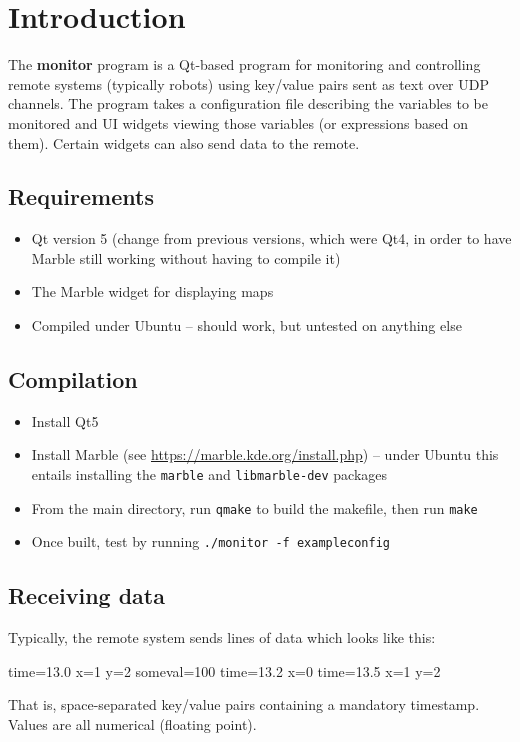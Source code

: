 \section{Introduction}
The \textbf{monitor} program is a Qt-based program for monitoring
and controlling remote systems (typically robots) using key/value pairs
sent as text over UDP channels. The program takes a configuration
file describing the variables to be monitored and UI widgets viewing
those variables (or expressions based on them). Certain widgets 
can also send data to the remote.

\subsection{Requirements}
\begin{itemize}
\item Qt version 5 (change from previous versions, which were Qt4, in
order to have Marble still working without having to compile it)
\item The Marble widget for displaying maps
\item Compiled under Ubuntu -- should work, but untested on anything else
\end{itemize}

\subsection{Compilation}
\begin{itemize}
\item Install Qt5
\item Install Marble (see \url{https://marble.kde.org/install.php}) --
under Ubuntu this entails installing the \texttt{marble} and \texttt{libmarble-dev}
packages
\item From the main directory, run \texttt{qmake} to build the makefile, then run \texttt{make}
\item Once built, test by running \texttt{./monitor -f exampleconfig}
\end{itemize}

\subsection{Receiving data}
Typically, the remote system sends lines of data which looks like this:
\begin{v}
time=13.0 x=1 y=2 someval=100
time=13.2 x=0
time=13.5 x=1 y=2
\end{v}
That is, space-separated key/value pairs containing a mandatory
timestamp. Values are all numerical (floating point).

